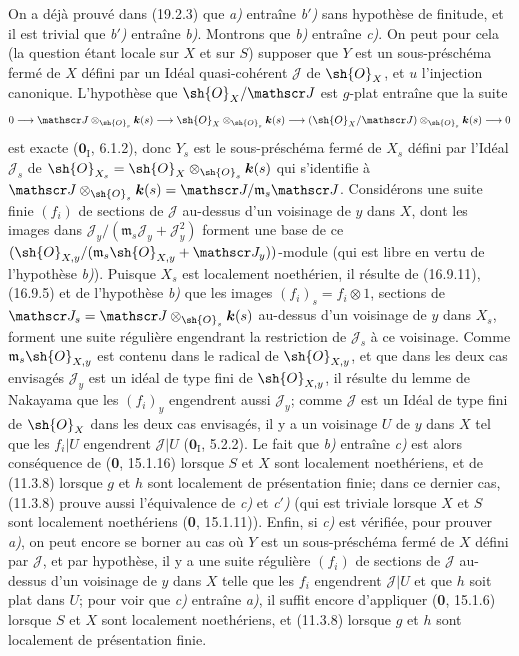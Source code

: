 On a déjà prouvé dans (19.2.3) que \emph{a)} entraîne \emph{b$'$)} sans hypothèse de finitude, et il est trivial que \emph{b$'$)} entraîne \emph{b)}. Montrons que \emph{b)} entraîne \emph{c)}. On peut pour cela (la question étant locale sur $X$ et sur $S$) supposer que $Y$ est un sous-préschéma fermé de $X$ défini par un Idéal quasi-cohérent $\mathscr J$ de $\sh{O}_X$, et $u$ l'injection canonique. L'hypothèse que $\sh{O}_X/\mathscr J$ est $g$-plat entraîne que la suite
\[
  0\longrightarrow\mathscr J\otimes_{\sh{O}_s}\boldsymbol{k}(s)\longrightarrow\sh{O}_X\otimes_{\sh{O}_s}\boldsymbol{k}(s)\longrightarrow(\sh{O}_X/\mathscr J)\otimes_{\sh{O}_s}\boldsymbol{k}(s)\longrightarrow0
\]
est exacte ($\mathbf{0}_{\mathrm I}$, 6.1.2), donc $Y_s$ est le sous-préschéma fermé de $X_s$ défini par l'Idéal $\mathscr J_s$ de $\sh{O}_{X_s}=\sh{O}_X\otimes_{\sh{O}_s}\boldsymbol{k}(s)$ qui s'identifie à $\mathscr J\otimes_{\sh{O}_s}\boldsymbol{k}(s)=\mathscr J/\mathfrak m_s\mathscr J$. Considérons une suite finie $(f_i)$ de sections de $\mathscr J$ au-dessus d'un voisinage de $y$ dans $X$, dont les images dans $\mathscr J_y/(\mathfrak m_s\mathscr J_y+\mathscr J_y^2)$ forment une base de ce $(\sh{O}_{X,y}/(\mathfrak m_s\sh{O}_{X,y}+\mathscr J_y))$-module (qui est libre en vertu de l'hypothèse \emph{b)}). Puisque $X_s$ est localement noethérien, il résulte de (16.9.11), (16.9.5) et de l'hypothèse \emph{b)} que les images $(f_i)_s=f_i\otimes1$, sections de $\mathscr J_s=\mathscr J\otimes_{\sh{O}_s}\boldsymbol{k}(s)$ au-dessus d'un voisinage de $y$ dans $X_s$, forment une suite régulière engendrant la restriction de $\mathscr J_s$ à ce voisinage. Comme $\mathfrak m_s\sh{O}_{X,y}$ est contenu dans le radical de $\sh{O}_{X,y}$, et que dans les deux cas envisagés $\mathscr J_y$ est un idéal de type fini de $\sh{O}_{X,y}$, il résulte du lemme de Nakayama que les $(f_i)_y$ engendrent aussi $\mathscr J_y$; comme $\mathscr J$ est un Idéal de type fini de $\sh{O}_X$ dans les deux cas envisagés, il y a un voisinage $U$ de $y$ dans $X$ tel que les $f_i|U$ engendrent $\mathscr J|U$ ($\mathbf{0}_{\mathrm I}$, 5.2.2). Le fait que \emph{b)} entraîne \emph{c)} est alors conséquence de (\textbf{0}, 15.1.16) lorsque $S$ et $X$ sont localement noethériens, et de (11.3.8) lorsque $g$ et $h$ sont localement de présentation finie; dans ce dernier cas, (11.3.8) prouve aussi l'équivalence de \emph{c)} et \emph{c$'$)} (qui est triviale lorsque $X$ et $S$ sont localement noethériens (\textbf{0}, 15.1.11)). Enfin, si \emph{c)} est vérifiée, pour prouver \emph{a)}, on peut encore se borner au cas où $Y$ est un sous-préschéma fermé de $X$ défini par $\mathscr J$, et par hypothèse, il y a une suite régulière $(f_i)$ de sections de $\mathscr J$ au-dessus d'un voisinage de $y$ dans $X$ telle que les $f_i$ engendrent $\mathscr J|U$ et que $h$ soit plat dans $U$; pour voir que \emph{c)} entraîne \emph{a)}, il suffit encore d'appliquer (\textbf{0}, 15.1.6) lorsque $S$ et $X$ sont localement noethériens, et (11.3.8) lorsque $g$ et $h$ sont localement de présentation finie.


